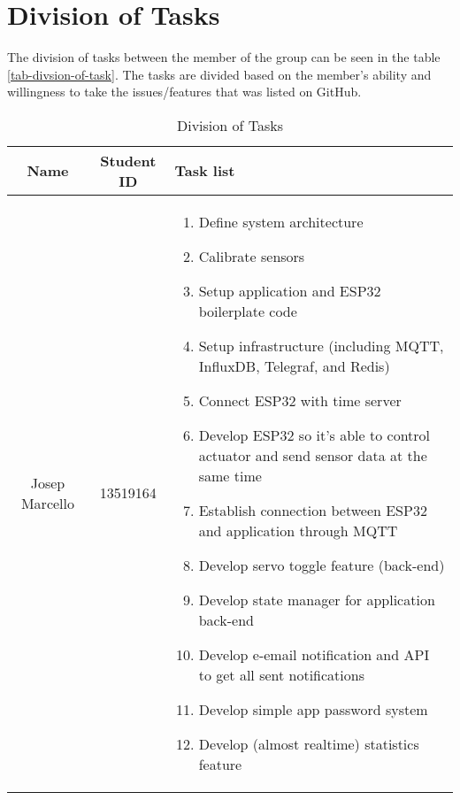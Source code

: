 \section*{Division of Tasks}

The division of tasks between the member of the group can be
seen in the table \ref{tab-divsion-of-task}.
The tasks are divided based on the member's ability and
willingness to take the issues/features that was listed on GitHub.

\begin{table*}[htbp]
	\caption{Division of Tasks}
	\begin{center}
		\begin{tabular}{|c|c|p{10cm}|}
			\hline
			\textbf{Name}    & \textbf{Student ID} & \textbf{Task list}                                                                        \\
			\hline
			Josep Marcello   & 13519164            & \begin{enumerate}[leftmargin=*]
				                                         \item Define system architecture
				                                         \item Calibrate sensors
				                                         \item Setup application and ESP32 boilerplate code
				                                         \item Setup infrastructure (including MQTT, InfluxDB, Telegraf, and Redis)
				                                         \item Connect ESP32 with time server
				                                         \item Develop ESP32 so it's able to control actuator and send sensor data at the same time
				                                         \item Establish connection between ESP32 and application through MQTT
				                                         \item Develop servo toggle feature (back-end)
				                                         \item Develop state manager for application back-end
				                                         \item Develop e-email notification and API to get all sent notifications
				                                         \item Develop simple app password system
				                                         \item Develop (almost realtime) statistics feature

\end{enumerate}
\end{tabular}
\end{center}
\end{table*}
